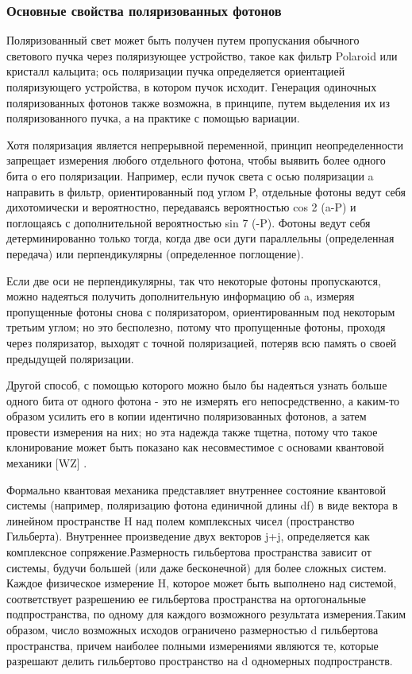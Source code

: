 \subsubsection{Основные свойства поляризованных фотонов}

­Поляризованный свет может быть получен путем пропускания обычного светового пучка через поляризующее устройство, такое как фильтр Polaroid или кристалл кальцита; ось поляризации пучка определяется ориентацией поляризующего устройства, в котором пучок исходит. Генерация одиночных поляризованных фотонов также возможна, в принципе, путем выделения их из поляризованного пучка, а на практике с помощью вариации.

­­Хотя поляризация является непрерывной переменной, принцип неопределенности запрещает измерения любого отдельного фотона, чтобы выявить более одного бита о его поляризации. Например, если пучок света с осью поляризации a направить в фильтр, ориентированный под углом P, отдельные фотоны ведут себя дихотомически и вероятностно, передаваясь вероятностью cos 2 (a-P) и поглощаясь с дополнительной вероятностью sin 7 (-P). Фотоны ведут себя детерминированно только тогда, когда две оси дуги параллельны (определенная передача) или перпендикулярны (определенное поглощение).

­­­Если две оси не перпендикулярны, так что некоторые фотоны пропускаются, можно надеяться получить дополнительную информацию об a, измеряя пропущенные фотоны снова с поляризатором, ориентированным под некоторым третьим углом; но это бесполезно, потому что пропущенные фотоны, проходя через поляризатор, выходят с точной поляризацией, потеряв всю память о своей предыдущей поляризации.

Другой способ, с помощью которого можно было бы надеяться узнать больше одного бита от одного фотона - это не измерять его непосредственно, а каким-то образом усилить его в копии идентично поляризованных фотонов, а затем провести измерения на них; но эта надежда также тщетна, потому что такое клонирование может быть показано как несовместимое с основами квантовой механики [WZ] .

­­­­Формально квантовая механика представляет внутреннее состояние квантовой системы (например, поляризацию фотона единичной длины df) в виде вектора в линейном пространстве H над полем комплексных чисел (пространство Гильберта). Внутреннее произведение двух векторов j+j, определяется как комплексное сопряжение.Размерность гильбертова пространства зависит от системы, будучи большей (или даже бесконечной) для более сложных систем. Каждое физическое измерение H, которое может быть выполнено над системой, соответствует разрешению ее гильбертова пространства на ортогональные подпространства, по одному для каждого возможного результата измерения.Таким образом, число возможных исходов ограничено размерностью d гильбертова пространства, причем наиболее полными измерениями являются те, которые разрешают делить гильбертово пространство на d одномерных подпространств.

